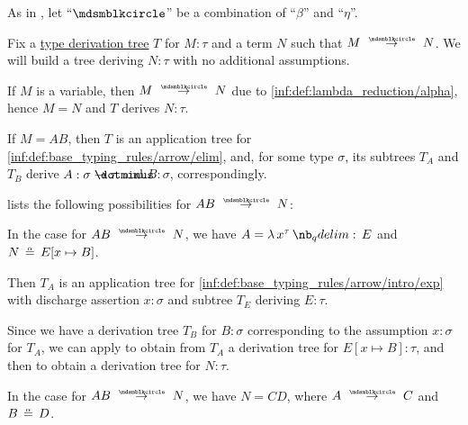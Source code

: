 \begin{proposition}\label{thm:}

\end{proposition}

\begin{algorithm}\label{alg:simply_typed_reduction}
  As in , let \enquote{\( {\Anon} \)} be a combination of \enquote{\( \beta \)} and \enquote{\( \eta \)}.

  Fix a \hyperref[def:type_derivation_tree]{type derivation tree} \( T \) for \( M: \tau \) and a term \( N \) such that \( M \pred N \). We will build a tree deriving \( N: \tau \) with no additional assumptions.

  \begin{thmenum}
     If \( M \) is a variable, then \( M \pred N \) due to \ref{inf:def:lambda_reduction/alpha}, hence \( M = N \) and \( T \) derives \( N: \tau \).

     If \( M = AB \), then \( T \) is an application tree for \ref{inf:def:base_typing_rules/arrow/elim}, and, for some type \( \sigma \), its subtrees \( T_A \) and \( T_B \) derive \( A: \sigma \synimplies \tau \) and \( B: \sigma \), correspondingly.

     lists the following possibilities for \( A B \pred N \):
    \begin{thmenum}
       In the case  for \( A B \pred N \), we have \( A = \qabs {x^\tau} E \) and \( N \aequiv E[x \mapsto B] \).

      Then \( T_A \) is an application tree for \ref{inf:def:base_typing_rules/arrow/intro/exp} with discharge assertion \( x: \sigma \) and subtree \( T_E \) deriving \( E: \tau \).

      Since we have a derivation tree \( T_B \) for \( B: \sigma \) corresponding to the assumption \( x: \sigma \) for \( T_A \), we can apply  to obtain from \( T_A \) a derivation tree for \( E[x \mapsto B]: \tau \), and then  to obtain a derivation tree for \( N: \tau \).

       In the case  for \( A B \pred N \), we have \( N = CD \), where \( A \pred C \) and \( B \aequiv D \).


\end{thmenum}
\end{thmenum}
\end{algorithm}
